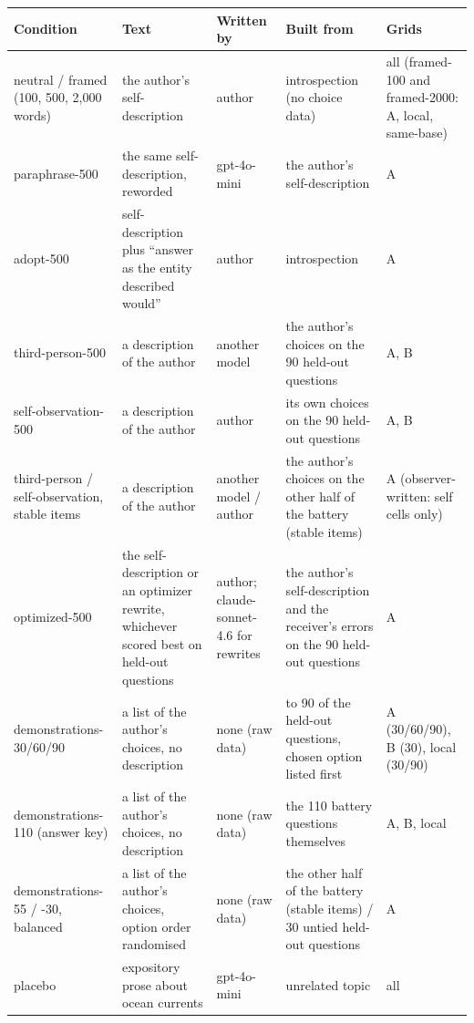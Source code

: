 \documentclass[11pt]{article}
\begin{document}
\begin{table}[p]
\centering\footnotesize\renewcommand{\arraystretch}{0.89}\setlength{\tabcolsep}{4pt}
\begin{tabular}{>{\raggedright\arraybackslash}p{3.0cm}>{\raggedright\arraybackslash}p{4.2cm}>{\raggedright\arraybackslash}p{2.0cm}>{\raggedright\arraybackslash}p{3.6cm}>{\raggedright\arraybackslash}p{1.8cm}}
\toprule
Condition & Text & Written by & Built from & Grids \\
\midrule
neutral / framed (100, 500, 2{,}000 words) & the author's self-description & author & introspection (no choice data) & all (framed-100 and framed-2000: A, local, same-base) \\
paraphrase-500 & the same self-description, reworded & gpt-4o-mini & the author's self-description & A \\
adopt-500 & self-description plus ``answer as the entity described would'' & author & introspection & A \\
third-person-500 & a description of the author & another model & the author's choices on the 90 held-out questions & A, B \\
self-observation-500 & a description of the author & author & its own choices on the 90 held-out questions & A, B \\
third-person / self-observation, stable items & a description of the author & another model / author & the author's choices on the other half of the battery (stable items) & A (observer-written: self cells only) \\
optimized-500 & the self-description or an optimizer rewrite, whichever scored best on held-out questions & author; claude-sonnet-4.6 for rewrites & the author's self-description and the receiver's errors on the 90 held-out questions & A \\
demonstrations-30/60/90 & a list of the author's choices, no description & none (raw data) & 30 to 90 of the held-out questions, chosen option listed first & A (30/60/90), B (30), local (30/90) \\
demonstrations-110 (answer key) & a list of the author's choices, no description & none (raw data) & the 110 battery questions themselves & A, B, local \\
demonstrations-55 / -30, balanced & a list of the author's choices, option order randomised & none (raw data) & the other half of the battery (stable items) / 30 untied held-out questions & A \\
placebo & expository prose about ocean currents & gpt-4o-mini & unrelated topic & all \\

\end{tabular}
\end{table}
\end{document}
